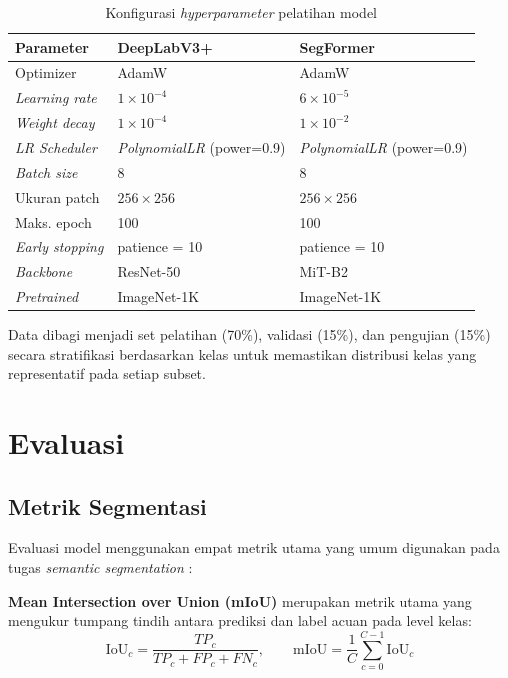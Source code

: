 \begin{table}[htbp]
\centering
\caption{Konfigurasi \textit{hyperparameter} pelatihan model}
\label{tab:hyperparams}
\begin{tabular}{lll}
\hline
\textbf{Parameter} & \textbf{DeepLabV3+} & \textbf{SegFormer} \\
\hline
Optimizer          & AdamW               & AdamW \\
\textit{Learning rate} & $1 \times 10^{-4}$ & $6 \times 10^{-5}$ \\
\textit{Weight decay}  & $1 \times 10^{-4}$ & $1 \times 10^{-2}$ \\
\textit{LR Scheduler}  & \textit{PolynomialLR} (power=0.9) & \textit{PolynomialLR} (power=0.9) \\
\textit{Batch size}    & 8                  & 8 \\
Ukuran patch       & $256\times256$      & $256\times256$ \\
Maks. epoch        & 100                 & 100 \\
\textit{Early stopping} & patience = 10   & patience = 10 \\
\textit{Backbone}      & ResNet-50          & MiT-B2 \\
\textit{Pretrained}    & ImageNet-1K        & ImageNet-1K \\
\hline
\end{tabular}
\end{table}

Data dibagi menjadi set pelatihan (70\%), validasi (15\%), dan pengujian (15\%) secara stratifikasi berdasarkan kelas untuk memastikan distribusi kelas yang representatif pada setiap subset.

\section{Evaluasi}

\subsection{Metrik Segmentasi}

Evaluasi model menggunakan empat metrik utama yang umum digunakan pada tugas \textit{semantic segmentation} \citep{thomasramos2024}:

\textbf{Mean Intersection over Union (mIoU)} merupakan metrik utama yang mengukur tumpang tindih antara prediksi dan label acuan pada level kelas:
\begin{equation}
    \text{IoU}_c = \frac{TP_c}{TP_c + FP_c + FN_c}, \qquad
    \text{mIoU} = \frac{1}{C} \sum_{c=0}^{C-1} \text{IoU}_c
\end{equation}

